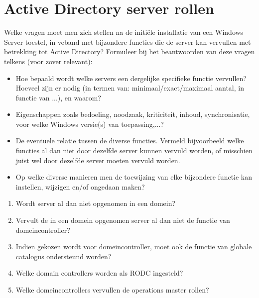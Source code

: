 \chapter{Active Directory server rollen}

Welke vragen moet men zich stellen na de initiële installatie van een Windows
Server toestel, in veband met bijzondere functies die de server kan vervullen
met betrekking tot Active Directory? Formuleer bij het beantwoorden van deze
vragen telkens (voor zover relevant):
\begin{itemize}
	\item Hoe bepaald wordt welke servers een dergelijke specifieke functie
		vervullen?  Hoeveel zijn er nodig (in termen van:
		minimaal/exact/maximaal aantal, in functie van ...), en waarom?
	\item Eigenschappen zoals bedoeling, noodzaak, kriticiteit, inhoud,
		synchronisatie, voor welke Windows versie(s) van toepassing,...?
	\item De eventuele relatie tussen de diverse functies. Vermeld
		bijvoorbeeld welke functies al dan niet door dezelfde server
		kunnen vervuld worden, of misschien juist wel door dezelfde
		server moeten vervuld worden.
	\item Op welke diverse manieren men de toewijzing van elke bijzondere
		functie kan instellen, wijzigen en/of ongedaan maken?
\end{itemize}

\begin{enumerate}
	\item Wordt server al dan niet opgenomen in een domein?
	\item Vervult de in een domein opgenomen server al dan niet de functie
		van domeincontroller?
	\item Indien gekozen wordt voor domeincontroller, moet ook de functie
		van globale catalogus ondersteund worden?
	\item Welke domain controllers worden als RODC ingesteld?
	\item Welke domeincontrollers vervullen de operations master rollen?
\end{enumerate}
